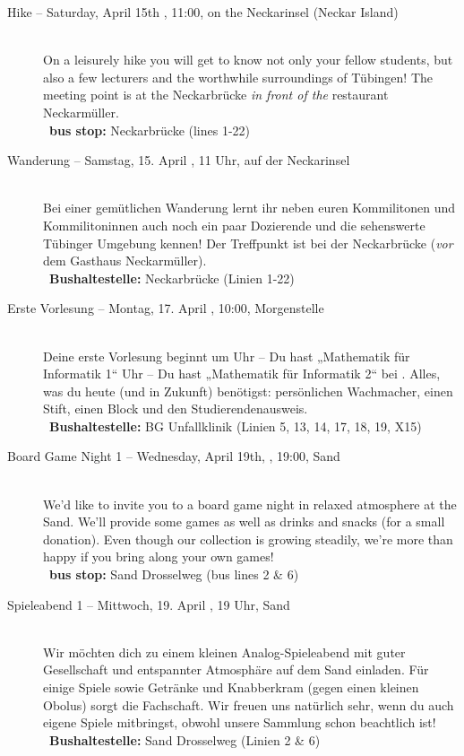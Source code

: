 \begin{description}

\ifml
	\item[Hike -- Saturday, April 15th \YEAR, 11:00, on the Neckarinsel (Neckar Island)]~\\
	On a leisurely hike you will get to know not only your fellow students,
	but also a few lecturers and the worthwhile surroundings of Tübingen!
	The meeting point is at the Neckarbrücke \emph{in front of the} restaurant \glqq Neckarmüller\grqq. \\
	~\textbf{bus stop:} Neckarbrücke (lines 1-22)
\else
	\item[Wanderung -- Samstag, 15. April \YEAR, 11 Uhr, auf der Neckarinsel]~\\
	Bei einer gemütlichen Wanderung lernt ihr neben euren Kommilitonen und Kommilitoninnen auch
	noch ein paar Dozierende und die sehenswerte Tübinger Umgebung kennen!
	Der Treffpunkt ist bei der Neckarbrücke (\emph{vor} dem Gasthaus \glqq Neckarmüller\grqq).\\
	~\textbf{Bushaltestelle:} Neckarbrücke (Linien 1-22)
\fi

\ifbachelor
	\item[Erste Vorlesung -- Montag, 17. April \YEAR, 10:00, Morgenstelle]~\\ %
	Deine erste Vorlesung beginnt um
	 Uhr -- Du hast „Mathematik für Informatik 1“  \fi
	 Uhr -- Du hast „Mathematik für Informatik 2“  \fi
	bei \Matheprof.
	Alles, was du heute (und in Zukunft) benötigst: persönlichen Wachmacher, einen Stift, einen Block und den Studierendenausweis.\\
	~\textbf{Bushaltestelle:} BG Unfallklinik (Linien 5, 13, 14, 17, 18, 19, X15)
\fi


\ifml
	\item[Board Game Night 1 -- Wednesday, April 19th, \YEAR, 19:00, Sand]~\\
	We'd like to invite you to a board game night in relaxed atmosphere at the Sand.
    We'll provide some games as well as drinks and snacks (for a small donation).
    Even though our collection is growing steadily, we're more than happy if you bring along your own games!\\
	~\textbf{bus stop:} Sand Drosselweg (bus lines 2 \& 6)
\else
    \item[Spieleabend 1 -- Mittwoch, 19. April \YEAR, 19 Uhr, Sand]~\\
	Wir möchten dich zu einem kleinen Analog-Spieleabend mit guter Gesellschaft und entspannter Atmosphäre auf dem Sand einladen.
    Für einige Spiele sowie Getränke und Knabberkram (gegen einen kleinen Obolus) sorgt die Fachschaft.
    Wir freuen uns natürlich sehr, wenn du auch eigene Spiele mitbringst, obwohl unsere Sammlung schon beachtlich ist!\\
	~\textbf{Bushaltestelle:} Sand Drosselweg (Linien 2 \& 6)
\fi


\end{description}
